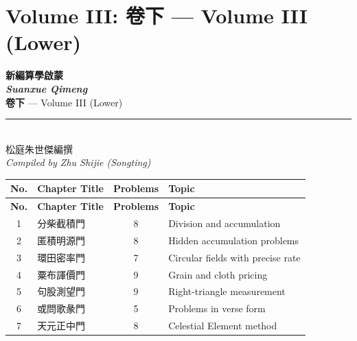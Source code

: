 \documentclass[11pt,a4paper]{article}
\newcommand{\longline}{\noindent\rule{\textwidth}{0.4pt}}
\begin{document}

\section*{Volume III: 卷下 --- Volume III (Lower)}

\begin{center}
\vspace*{1cm}
{\fontsize{24}{28}\selectfont\bfseries\color{vol3color}
新編算學啟蒙\\[0.5cm]
\textit{Suanxue Qimeng}\\[0.3cm]
}
\vspace{0.5cm}
{\fontsize{18}{22}\selectfont\color{vol3color}
\textbf{卷下} --- Volume III (Lower)\\[0.3cm]
}
\vspace{0.5cm}
\longline\\[0.5cm]
{\large 松庭朱世傑編撰\\[0.3cm]
\textit{Compiled by Zhu Shijie (Songting)}\\[0.3cm]
}
\end{center}

\vspace{1cm}

\begin{center}
\begin{longtable}{|c|l|c|l|}
\hline
\textbf{No.} & \textbf{Chapter Title} & \textbf{Problems} & \textbf{Topic} \\
\hline
\endfirsthead
\hline
\textbf{No.} & \textbf{Chapter Title} & \textbf{Problems} & \textbf{Topic} \\
\hline
\endhead
1 & 分柴截積門 & 8 & Division and accumulation \\
2 & 匿積明源門 & 8 & Hidden accumulation problems \\
3 & 環田密率門 & 7 & Circular fields with precise rate \\
4 & 粟布諢價門 & 9 & Grain and cloth pricing \\
5 & 句股測望門 & 9 & Right-triangle measurement \\
6 & 或問歌彖門 & 5 & Problems in verse form \\
7 & 天元正中門 & 8 & Celestial Element method \\
\hline
\end{longtable}
\end{center}
\end{document}
